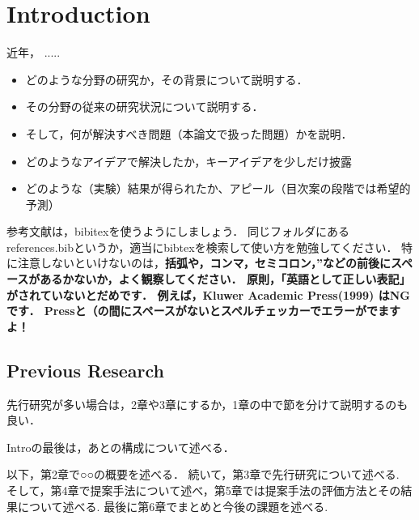 \chapter{Introduction}
近年， .....


\begin{itemize}
 \setlength{\parskip}{0cm} %
 \setlength{\itemsep}{0cm} %
 \item どのような分野の研究か，その背景について説明する．
 \item その分野の従来の研究状況について説明する．
 \item そして，何が解決すべき問題（本論文で扱った問題）かを説明．
 \item どのようなアイデアで解決したか，キーアイデアを少しだけ披露
 \item どのような（実験）結果が得られたか、アピール（目次案の段階では希望的予測）
\end{itemize}

参考文献は，bibitexを使うようにしましょう\cite{栗原一貴2006プレゼン先生}．
同じフォルダにあるreferences.bibというか，適当にbibtexを検索して使い方を勉強してください．
特に注意しないといけないのは，{\bf 括弧や，コンマ，セミコロン，''などの前後にスペースがあるかないか，よく観察してください．
原則，「英語として正しい表記」がされていないとだめです．
例えば，Kluwer Academic Press(1999) はNGです．
Pressと（の間にスペースがないとスペルチェッカーでエラーがでますよ！}


 \section{Previous Research}
 先行研究が多い場合は，2章や3章にするか，1章の中で節を分けて説明するのも良い．

 Introの最後は，あとの構成について述べる．

 以下，第2章で○○の概要を述べる．
 続いて，第3章で先行研究について述べる.
 そして，第4章で提案手法について述べ，第5章では提案手法の評価方法とその結果について述べる.
 最後に第6章でまとめと今後の課題を述べる.
